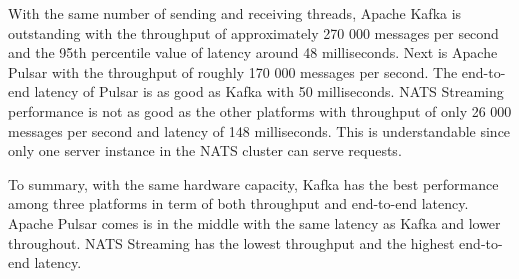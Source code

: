 \fi
With the same number of sending and receiving threads, Apache Kafka is outstanding with the throughput of approximately 270 000 messages per second and the 95th percentile value of latency around 48 milliseconds. Next is Apache Pulsar with the throughput of roughly 170 000 messages per second. The end-to-end latency of Pulsar is as good as Kafka with 50 milliseconds. NATS Streaming performance is not as good as the other platforms with throughput of only 26 000 messages per second and latency of 148 milliseconds. This is understandable since only one server instance in the NATS cluster can serve requests. 

To summary, with the same hardware capacity, Kafka has the best performance among three platforms in term of both throughput and end-to-end latency. Apache Pulsar comes is in the middle with the same latency as Kafka and lower throughout. NATS Streaming has the lowest throughput and the highest end-to-end latency.
